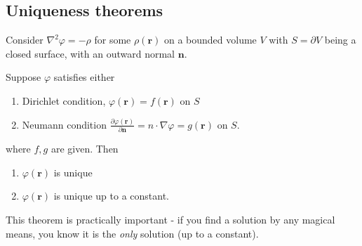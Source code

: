 \documentclass[a4paper]{article}
\begin{document}
\subsection{Uniqueness theorems}
\begin{thm}
  Consider $\nabla^2 \varphi = - \rho$ for some $\rho (\mathbf{r})$ on a bounded volume $V$ with $S = \partial V$ being a closed surface, with an outward normal $\mathbf{n}$.

  Suppose $\varphi$ satisfies either
  \begin{enumerate}
    \item Dirichlet condition, $\varphi(\mathbf{r}) = f(\mathbf{r})$ on $S$
    \item Neumann condition $\frac{\partial \varphi(\mathbf{r})}{\partial \mathbf{n}} = n\cdot \nabla \varphi = g(\mathbf{r})$ on $S$.
  \end{enumerate}
  where $f, g$ are given. Then
  \begin{enumerate}
    \item $\varphi(\mathbf{r})$ is unique
    \item $\varphi(\mathbf{r})$ is unique up to a constant.
  \end{enumerate}
\end{thm}
This theorem is practically important - if you find a solution by any magical means, you know it is the \emph{only} solution (up to a constant).
\end{document}
